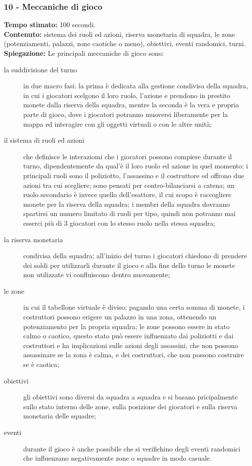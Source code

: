 \documentclass[
	twoside]				%
	{toptesi}				%
\begin{document}
	\subsubsection{10 - Meccaniche di gioco}
	
	\textbf{Tempo stimato:} 100 secondi. \\
	
	\textbf{Contenuto:} sistema dei ruoli ed azioni, riserva monetaria di squadra, le zone (potenziamenti, palazzi, zone caotiche o meno), obiettivi, eventi randomici, turni. \\
	
	\textbf{Spiegazione:} Le principali meccaniche di gioco sono:
	\begin{description}
		\item[la suddivisione del turno] in due macro fasi: la prima è dedicata alla gestione condivisa della squadra, in cui i giocatori scelgono il loro ruolo, l'azione e prendono in prestito monete dalla riserva della squadra, mentre la seconda è la vera e propria parte di gioco, dove i giocatori potranno muoversi liberamente per la mappa ed interagire con gli oggetti virtuali o con le altre unità;
		
		\item[il sistema di ruoli ed azioni] che definisce le interaziomi che i giocatori possono compiere durante il turno, dipendentemente da qual'è il loro ruolo ed azione in quel momento; i principali ruoli sono il poliziotto, l'assassino e il costruttore ed offrono due azioni tra cui scegliere; sono pensati per contro-bilanciarsi a catena; un ruolo secondario è invece quello dell'esattore, il cui scopo è raccogliere monete per la riserva della squadra; i membri della squadra dovranno spartirsi un numero limitato di ruoli per tipo, quindi non potranno mai esserci più di 3 giocatori con lo stesso ruolo nella stessa squadra;
		
		\item[la riserva monetaria] condivisa della squadra; all'inizio del turno i giocatori chiedono di prendere dei soldi per utilizzarli durante il gioco e alla fine dello turno le monete non utilizzate vi confluiscono dentro nuovamente;
		
		\item[le zone] in cui il tabellone virtuale è diviso; pagando una certa somma di monete, i costruttori possono erigere un palazzo in una zona, ottenendo un potenziamento per la propria squadra; le zone possono essere in stato calmo o caotico, questo stato può essere influenzato dai poliziotti e dai costruttori e ha implicazioni sulle azioni degli assassini, che non possono assassinare se la zona è calma, e dei costruttori, che non possono costruire se è caotica; 
		
		\item[obiettivi] gli obiettivi sono diversi da squadra a squadra e si basano pricipalmente sullo stato interno delle zone, sulla posizione dei giocatori e sulla riserva monetaria delle squadre;
		
		\item[eventi] durante il gioco è anche possibile che si verifichino degli eventi randomici che influenzano negativamente zone o squadre in modo casuale. 
	\end{description}
	
\end{document}
